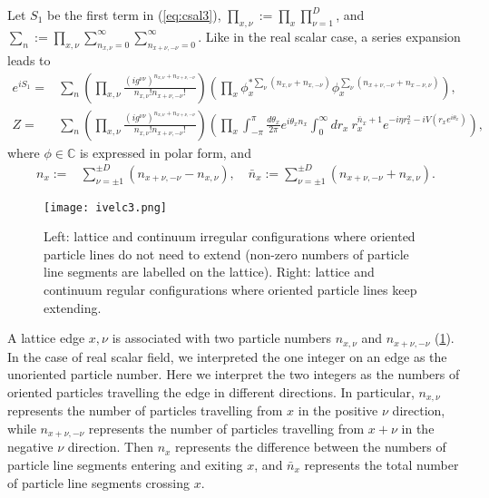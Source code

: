 \documentclass[12pt]{article}
\theoremstyle{definition}
\begin{document}
Let $S_{1}$ be the first term in (\ref{eq:csal3}), $\prod_{x,\nu}:= \prod_x \prod_{\nu=1}^D$, and $\sum_{n}:=\prod_{x,\nu} \sum_{n_{x,\nu}=0}^\infty \sum_{n_{x+\nu,-\nu}=0}^\infty$. Like in the real scalar case, a series expansion leads to \cite{Gattringer2013SpectroscopyGas, Gattringer2016ApproachesTheory}
\begin{align}
e^{iS_{1}}=&\sum_{n}
(\prod_{x,\nu}\frac{(i g^{\nu\nu})^{n_{x,\nu}+n_{x+\nu,-\nu}}}{n_{x,\nu}! n_{x+\nu,-\nu}!})
(\prod_{x}\phi_x^{*\sum_\nu(n_{x,\nu}+n_{x,-\nu})} \phi_x^{\sum_\nu(n_{x+\nu,-\nu}+n_{x-\nu,\nu})}),
\\Z=&\sum_{n}(\prod_{x,\nu} \frac{(i g^{\nu\nu})^{n_{x,\nu}+n_{x+\nu,-\nu}}}{n_{x,\nu}! n_{x+\nu,-\nu}!}) (\prod_{x} \int_{-\pi}^{\pi} \frac{d\theta_x}{2\pi} e^{i \theta_x n_x} \int_0^\infty dr_x ~ r_x^{\bar{n}_x+1} e^{-i\eta r_x^2-iV(r_x e^{i\theta_x})}),\label{eq:csfgp}
\end{align}
where $\phi\in\mathbb{C}$ is expressed in polar form, and 
\begin{align}
n_x:=&\sum_{\nu=\pm 1}^{\pm D} (n_{x+\nu,-\nu}-n_{x,\nu}),\quad \bar{n}_x:=\sum_{\nu=\pm 1}^{\pm D}(n_{x+\nu,-\nu}+n_{x,\nu}).
\label{eq:nxo}
\end{align}

\begin{figure}%
    \centering
    \texttt{[image: ivelc3.png]}
    \caption{Left: lattice and continuum irregular configurations where oriented particle lines do not need to extend (non-zero numbers of particle line segments are labelled on the lattice). Right: lattice and continuum regular configurations where oriented particle lines keep extending.}
    \label{fig:ivelc3}
\end{figure} 

A lattice edge $x,\nu$ is associated with two particle numbers $n_{x,\nu}$ and $n_{x+\nu,-\nu}$ (\cref{fig:ivelc3}). In the case of real scalar field, we interpreted the one integer on an edge as the unoriented particle number. Here we interpret the two integers as the numbers of oriented particles travelling the edge in different directions. In particular, $n_{x,\nu}$ represents the number of particles travelling from $x$ in the positive $\nu$ direction, while $n_{x+\nu,-\nu}$ represents the number of particles travelling from $x+\nu$ in the negative $\nu$ direction. Then $n_x$ represents the difference between the numbers of particle line segments entering and exiting $x$, and $\bar{n}_x$ represents the total number of particle line segments crossing $x$.
\end{document}
